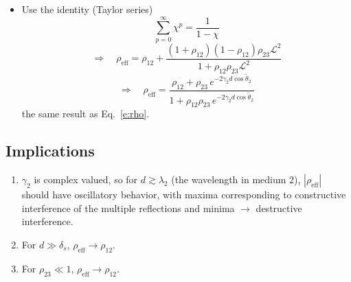 \documentclass[11pt, oneside]{article}
\begin{document}
\begin{itemize}
	Recall that
	\begin{equation}
		\tau_{12} = 1 + \rho_{12}.
	\end{equation}
	\item Use the identity (Taylor series)
	\begin{equation}
		\sum_{p=0}^{\infty}\chi^p = \frac{1}{1-\chi}
	\end{equation}
	\begin{equation}
		\Rightarrow\quad \rho_\mathrm{eff} = \rho_{12} + \frac{\left(1+\rho_{12}\right)\left(1-\rho_{12}\right)\rho_{23}\mathcal{L}^2}{1 + \rho_{12}\rho_{23}\mathcal{L}^2}
	\end{equation}
	\begin{equation}
		\Rightarrow\quad \boxed{\rho_\mathrm{eff} = \frac{\rho_{12} + \rho_{23}\,e^{-2\gamma_2d\cos\tilde{\theta}_2}}{1 + \rho_{12}\rho_{23}\,e^{-2\gamma_2d\cos\tilde{\theta}_2}}}
	\end{equation}
	the same result as Eq.~\eqref{e:rho}.
\end{itemize}

\subsection{Implications}
\label{s:implications}

\begin{enumerate}
	\item $\gamma_2$ is complex valued, so for $d \gtrsim \lambda_2$ (the wavelength in medium 2), $|\rho_\mathrm{eff}|$ should have oscillatory behavior, with maxima corresponding to constructive interference of the multiple reflections and minima $\rightarrow$ destructive interference.
	\item For $d \gg \delta_s$, $\rho_\mathrm{eff} \rightarrow \rho_{12}$.
	\item For $\rho_{23} \ll 1$, $\rho_\mathrm{eff} \rightarrow \rho_{12}$.
\end{enumerate}
\end{document}
